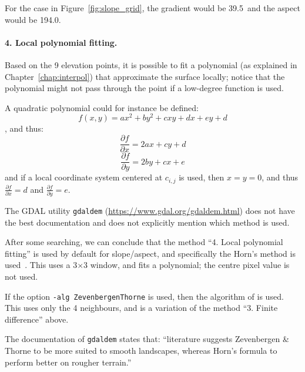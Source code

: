 For the case in Figure~\ref{fig:slope_grid}, the gradient would be 39.5\degree\ and the aspect would be 194.0\degree.


\paragraph{4. Local polynomial fitting.}%
\label{sec:polynomial}

Based on the 9 elevation points, it is possible to fit a polynomial (as explained in Chapter~\ref{chap:interpol}) that approximate the surface locally; notice that the polynomial might not pass through the point if a low-degree function is used.

A quadratic polynomial could for instance be defined:
\begin{equation}
  f(x,y) = ax^2 + by^2 + cxy + dx + ey +d
\end{equation}
, and thus:
\begin{equation}
  \frac{\partial f}{\partial x} = 2ax + cy + d
\end{equation}
\begin{equation}
  \frac{\partial f}{\partial y} = 2by + cx + e
\end{equation}
and if a local coordinate system centered at $c_{i,j}$ is used, then $x = y = 0$, and thus $\frac{\partial f}{\partial x} = d$ and $\frac{\partial f}{\partial y} = e$.


\begin{floatbox}
  \begin{kaobox-practice}[frametitle=\faCog\ How does it work in practice?]
    The GDAL utility \texttt{gdaldem} (\url{https://www.gdal.org/gdaldem.html}) does not have the best documentation and does not explicitly mention which method is used.

    After some searching, we can conclude that the method ``4. Local polynomial fitting'' is used by default for slope/aspect, and specifically the Horn's method is used~\citep{Horn81}.
    This uses a 3$\times$3 window, and fits a polynomial; the centre pixel value is not used.

    If the option \texttt{-alg ZevenbergenThorne} is used, then the algorithm of \citet{Zevenbergen87} is used. 
    This uses only the 4 neighbours, and is a variation of the method ``3. Finite difference'' above.

    The documentation of \texttt{gdaldem} states that: ``literature suggests Zevenbergen \& Thorne to be more suited to smooth landscapes, whereas Horn's formula to perform better on rougher terrain.''
  \end{kaobox-practice}
\end{floatbox}


